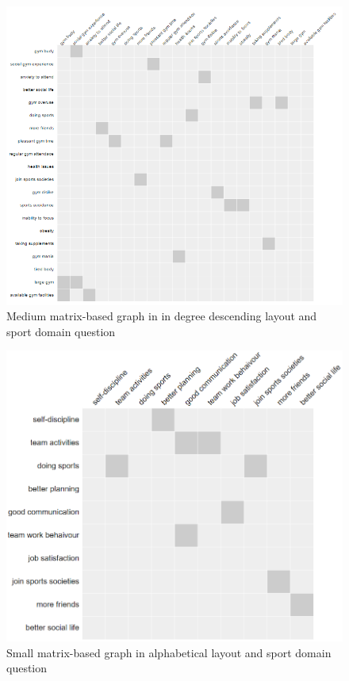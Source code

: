 \documentclass{l4proj}
\begin{document}
\begin{appendices}
\begin{figure}[H]
\centering
\includegraphics[width=16cm]{images/gymMedInDD.PNG}
\caption{Medium matrix-based graph in in degree descending layout and sport domain question}
\label{gymMedInDD}
\end{figure}

\begin{figure}[H]
\centering
\includegraphics[width=16cm]{images/gymSmallAlpha.PNG}
\caption{Small matrix-based graph in alphabetical layout and sport domain question}
\label{gymSmallAlpha}
\end{figure}



\end{appendices}
\end{document}
